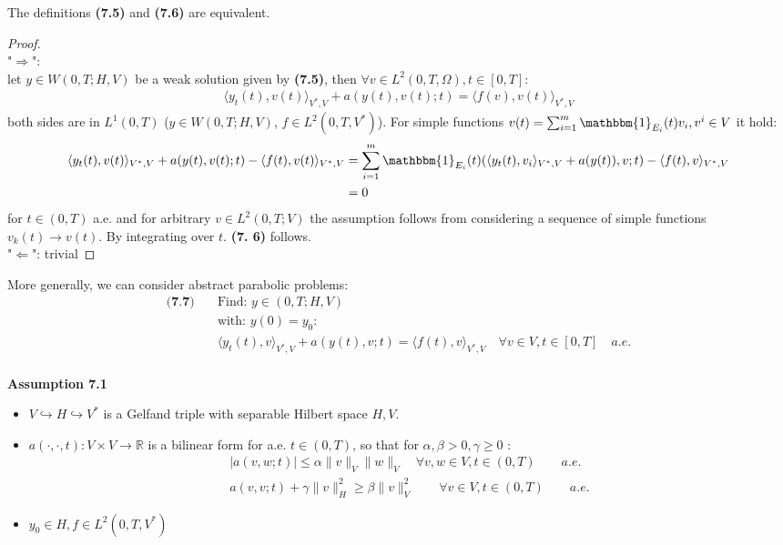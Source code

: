 \begin{theorem}
	The definitions \textbf{(7.5)} and \textbf{(7.6)} are equivalent. 
\end{theorem}
\begin{proof}\quad\\
"$\Rightarrow$": \quad\\
	let $y \in W(0, T; H, V)$ be a weak solution given by \textbf{(7.5)}, then  $\forall v \in L^2(0, T, \Omega), t \in [0, T]$:
	\begin{align*}
		\langle y_t(t), v(t) \rangle_{V^*, V} + a(y(t), v(t); t) =\langle f(v), v(t) \rangle_{V^*, V}
	\end{align*} 
	both sides are in $L^1(0, T)$ ($y \in W(0, T;H, V)$, $f \in L^2(0, T, V^*)$). For simple functions $v(t) = \sum_{i = 1}^m \mathbbm{1}_{E_i}(t) v_i, v^i \in V$ it hold:
	\begin{align*}
		\langle y_t(t), v(t) \rangle_{V^*, V} + a(y(t), v(t); t) - \langle f(t), v(t) \rangle_{V^*, V} &= 
		\sum_{i = 1}^m \mathbbm{1}_{E_i}(t) (\langle y_t(t), v_i \rangle_{V^*, V} + a(y(t)), v; t) - \langle f(t), v \rangle_{V^*, V}\\
		 &= 0
	\end{align*}
	for $t \in (0, T)$ a.e. and for arbitrary $v \in L^2(0, T; V)$ the assumption follows from considering a sequence of simple functions $v_k(t) \rightarrow v(t)$. By integrating over $t$. \textbf{(7. 6)} follows. \\
	"$\Leftarrow$": trivial
\end{proof}

More generally, we can consider abstract parabolic problems: 
\begin{align*}\textbf{(7.7)} \quad
	&\text{Find: } y \in (0, T; H, V)\\
	&\text{with: } y(0) = y_0: \\
	&\langle y_t(t), v \rangle_{V^*,  V} + a(y(t), v; t) = \langle f(t), v \rangle_{V^*, V} \quad \forall v \in V, t \in [0, T] \quad a.e.
\end{align*}
\quad\\
\textbf{Assumption 7.1}
\begin{itemize}
	\item $V \hookrightarrow H \hookrightarrow V^*$ is a Gelfand triple with separable Hilbert space $H, V$. 
	\item $a(\cdot, \cdot, t): V \times V \rightarrow \mathbb{R}$ is a bilinear form for a.e. $t \in (0, T)$, so that for $\alpha, \beta > 0, \gamma \geq 0$ :
	\begin{align*}
		|a(v, w;t)| \le \alpha \|v\|_V \|w\|_V \quad \forall v, w \in V, t \in (0, T) \qquad a.e.\\
		a(v, v;t) + \gamma \|v\|_H^2 \geq \beta \|v\|_V^2 \qquad \forall v \in V, t \in (0, T) \qquad a.e.
	\end{align*}
	\item $y_0 \in H, f \in L^2(0, T, V^*)$
\end{itemize}

